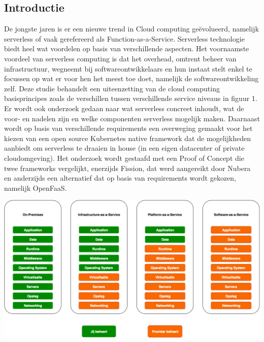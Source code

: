 \documentclass[a0,portrait]{a0poster}
\begin{document}
\begin{multicols}{2}
\section*{Introductie}
\color{black}
\color{black}
De jongste jaren is er een nieuwe trend in Cloud computing geëvolueerd, namelijk serverless of vaak gerefereerd als Function-as-a-Service. Serverless technologie biedt heel wat voordelen op basis van verschillende aspecten. Het voornaamste voordeel van serverless computing is dat het overhead, omtrent beheer van infrastructuur, wegneemt bij softwareontwikkelaars en hun instaat stelt enkel te focussen op wat er voor hen het meest toe doet, namelijk de softwareontwikkeling zelf.
Deze studie behandelt een uiteenzetting van de cloud computing basisprincipes zoals de verschillen tussen verschillende service niveaus in figuur 1. Er wordt ook onderzoek gedaan naar wat serverless concreet inhoudt, wat de voor- en nadelen zijn en welke componenten serverless mogelijk maken. Daarnaast wordt op basis van verschillende requirements een overweging gemaakt voor het kiezen van een open source Kubernetes native framework dat de mogelijkheden aanbiedt om serverless te draaien in house (in een eigen datacenter of private cloudomgeving). Het onderzoek wordt gestaafd met een Proof of Concept die twee frameworks vergelijkt, enerzijds Fission, dat werd aangereikt door Nubera en anderzijds een alternatief dat op basis van requirements wordt gekozen, namelijk OpenFaaS.
\begin{center}\vspace{1cm}
    \includegraphics[width=0.8\linewidth]{service-niveaus}
    \label{fig:service-niveaus}
\end{center}\vspace{1cm}


\end{multicols}
\end{document}

